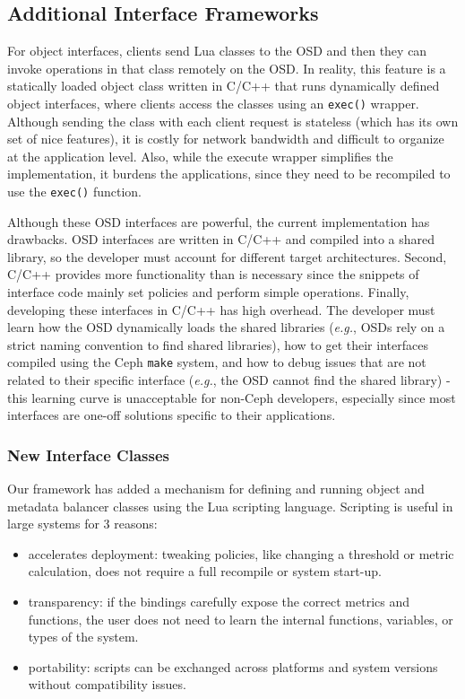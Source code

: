\documentclass[10pt,twocolumn]{article}
\begin{document}
\subsection{Additional Interface
Frameworks}\label{additional-interface-frameworks}

For object interfaces, clients send Lua classes to the OSD and then they
can invoke operations in that class remotely on the OSD. In reality,
this feature is a statically loaded object class written in C/C++ that
runs dynamically defined object interfaces, where clients access the
classes using an \texttt{exec()} wrapper. Although sending the class
with each client request is stateless (which has its own set of nice
features), it is costly for network bandwidth and difficult to organize
at the application level. Also, while the execute wrapper simplifies the
implementation, it burdens the applications, since they need to be
recompiled to use the \texttt{exec()} function.

Although these OSD interfaces are powerful, the current implementation
has drawbacks. OSD interfaces are written in C/C++ and compiled into a
shared library, so the developer must account for different target
architectures. Second, C/C++ provides more functionality than is
necessary since the snippets of interface code mainly set policies and
perform simple operations. Finally, developing these interfaces in C/C++
has high overhead. The developer must learn how the OSD dynamically
loads the shared libraries (\emph{e.g.}, OSDs rely on a strict naming
convention to find shared libraries), how to get their interfaces
compiled using the Ceph \texttt{make} system, and how to debug issues
that are not related to their specific interface (\emph{e.g.}, the OSD
cannot find the shared library) - this learning curve is unacceptable
for non-Ceph developers, especially since most interfaces are one-off
solutions specific to their applications.

\subsubsection{New Interface Classes}\label{new-interface-classes}

Our framework has added a mechanism for defining and running object and
metadata balancer classes using the Lua scripting language. Scripting is
useful in large systems for 3 reasons:

\begin{itemize}
\item
  accelerates deployment: tweaking policies, like changing a threshold
  or metric calculation, does not require a full recompile or system
  start-up.
\item
  transparency: if the bindings carefully expose the correct metrics and
  functions, the user does not need to learn the internal functions,
  variables, or types of the system.
\item
  portability: scripts can be exchanged across platforms and system
  versions without compatibility issues.
\end{itemize}
\end{document}
